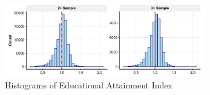 



% 

\begin{figure}[!thbp]
\centering
\caption{\label{fig:hists}Histograms of Educational Attainment Index}
\includegraphics[width=0.78\textwidth]{figures/hists.pdf}
\end{figure}



